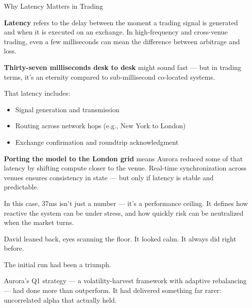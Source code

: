 \begin{TechnicalSidebar}{Why Latency Matters in Trading}

  \textbf{Latency} refers to the delay between the moment a trading signal is generated and when it is executed 
  on an exchange.  
  In high-frequency and cross-venue trading, even a few milliseconds can mean the difference between arbitrage 
  and loss.

  \medskip

  \textbf{Thirty-seven milliseconds desk to desk} might sound fast — but in trading terms, it’s an eternity 
  compared to sub-millisecond co-located systems.  

  \medskip

  That latency includes:

  \begin{itemize}
    \item Signal generation and transmission
    \item Routing across network hops (e.g., New York to London)
    \item Exchange confirmation and roundtrip acknowledgment
  \end{itemize}

  \medskip

  \textbf{Porting the model to the London grid} means Aurora reduced some of that latency by shifting compute 
  closer to the venue.  
  Real-time synchronization across venues ensures consistency in state — but only if latency is stable and 
  predictable.

  \medskip

  In this case, 37ms isn't just a number — it's a performance ceiling.  
  It defines how reactive the system can be under stress, and how quickly risk can be neutralized when the 
  market turns.

\end{TechnicalSidebar}

\medskip

David leaned back, eyes scanning the floor. It looked calm.
It always did right before.

The initial run had been a triumph.

Aurora’s Q1 strategy — a volatility-harvest framework with adaptive rebalancing — had done more than 
outperform. It had delivered something far rarer: uncorrelated alpha that actually held.

\medskip

